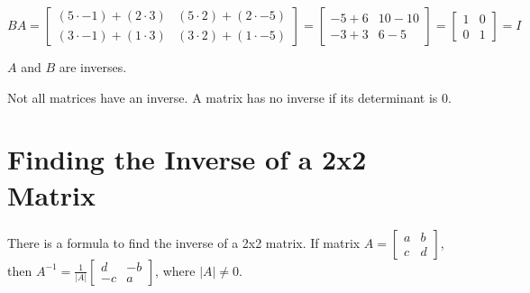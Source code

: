 \documentclass{report}
\begin{document}
$
    BA=
    \begin{bmatrix}
        (5 \cdot -1)+(2 \cdot 3) & (5 \cdot 2)+(2 \cdot -5) \\
        (3 \cdot -1)+(1 \cdot 3) & (3 \cdot 2)+(1 \cdot -5)
    \end{bmatrix}
    =
    \begin{bmatrix}
        -5+6 & 10-10 \\
        -3+3 & 6-5
    \end{bmatrix}
    =
    \begin{bmatrix}
        1 & 0 \\
        0 & 1
    \end{bmatrix}
    =I
$

$A$ and $B$ are inverses.

Not all matrices have an inverse. A matrix has no inverse if its determinant is 0.

\section{Finding the Inverse of a 2x2 Matrix}

There is a formula to find the inverse of a 2x2 matrix. If matrix 
$
    A=
    \begin{bmatrix}
        a & b \\
        c & d
    \end{bmatrix}
$, then 
$
    A^{-1}=\frac{1}{|A|}
    \begin{bmatrix}
        d & -b \\
        -c & a
    \end{bmatrix}
$, 
where $|A| \neq 0$.

\end{document}
